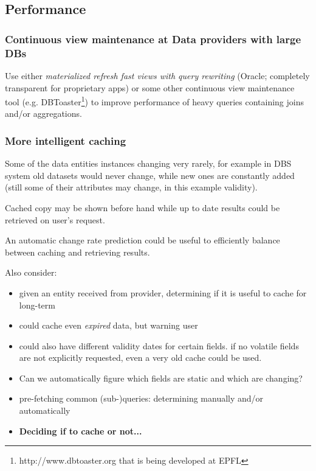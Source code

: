 \subsection{Performance}
\subsubsection{Continuous view maintenance at Data providers with large DBs}
Use either \textit{materialized refresh fast views with query rewriting} (Oracle; completely transparent for proprietary apps)\cite{Oracle11}
 or some other continuous view maintenance tool (e.g. DBToaster\footnote{http://www.dbtoaster.org that is being developed at EPFL}) to improve performance of heavy queries containing joins and/or aggregations.



\subsubsection{More intelligent caching}
Some of the data entities instances changing very rarely, for example in DBS system old datasets would never change, while new ones are constantly added (still some of their attributes may change, in this example validity).

Cached copy may be shown before hand while up to date results could be retrieved on user's request.

An automatic change rate prediction could be useful to efficiently balance between caching and retrieving results.

Also consider:
                			\begin{itemize}
                			\item given an entity received from provider, determining if it is useful to cache for long-term
                			\item could cache even \textit{expired} data, but warning user
                			\item could also have different validity dates for certain fields. if no volatile fields are not explicitly requested, even a very old cache could be used. 
                			\item Can we automatically figure which fields are static and which are changing?
                			\item pre-fetching common (sub-)queries: determining manually and/or automatically
                			
                			\item \textbf{Deciding if to cache or not...}

                			\end{itemize}



